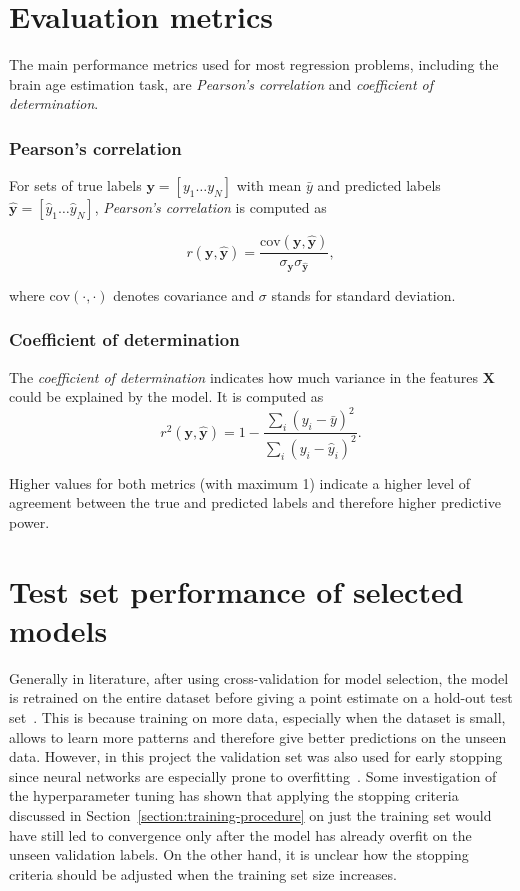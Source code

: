 \section{Evaluation metrics}
\label{section:evaluation-metrics}
The main performance metrics used for most regression problems, including the brain age estimation task, are \textit{Pearson's correlation} and \textit{coefficient of determination}.

\subsubsection{Pearson's correlation}
For sets of true labels $\mathbf{y}  = [y_1 \dots y_N]$ with mean $\bar{y}$ and predicted labels $\mathbf{\hat{y}} = [\hat{y}_1 \dots \hat{y}_N]$, \textit{Pearson's correlation} is computed as

\begin{equation}
    r(\mathbf{y}, \mathbf{\hat{y}}) = \frac{\mathrm{cov}(\mathbf{y}, \mathbf{\hat{y}})}{\sigma_{\mathbf{y}} \sigma_{\mathbf{\hat{y}}}},
\end{equation}

where $\mathrm{cov}(\cdot, \cdot)$ denotes covariance and $\sigma$ stands for standard deviation. 

\subsubsection{Coefficient of determination}
The \textit{coefficient of determination} indicates how much variance in the features $\mathbf{X}$ could be explained by the model. It is computed as 
\begin{equation}
    r^2(\mathbf{y}, \mathbf{\hat{y}}) = 1 - \frac{\sum_{i} (y_i - \bar{y})^2}{\sum_{i} (y_i - \hat{y}_i)^2}.
\end{equation}

Higher values for both metrics (with maximum 1) indicate a higher level of agreement between the true and predicted labels and therefore higher predictive power.


\section{Test set performance of selected models}
Generally in literature, after using cross-validation for model selection, the model is retrained on the entire dataset before giving a point estimate on a hold-out test set~\cite{raschka2018model}. This is because training on more data, especially when the dataset is small, allows to learn more patterns and therefore give better predictions on the unseen data. However, in this project the validation set was also used for early stopping since neural networks are especially prone to overfitting~\cite{prechelt1998automatic}. Some investigation of the hyperparameter tuning has shown that applying the stopping criteria discussed in Section~\ref{section:training-procedure} on just the training set would have still led to convergence only after the model has already overfit on the unseen validation labels. On the other hand, it is unclear how the stopping criteria should be adjusted when the training set size increases. 

